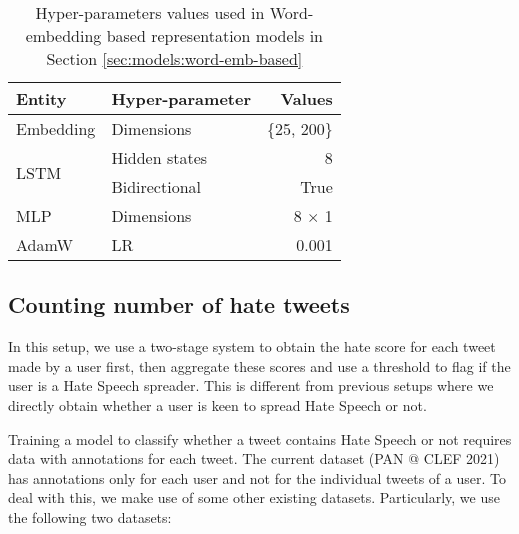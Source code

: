 

\begin{table}[htbp]
\centering
\begin{tabular}{llr}
\hline
\textbf{Entity} & \textbf{Hyper-parameter} & \textbf{Values} \\
\hline
Embedding & Dimensions & \{25, 200\} \\ \hline
\multirow{2}{*}{LSTM} & Hidden states & 8 \\
 & Bidirectional & True \\ \hline
MLP & Dimensions & 8 $\times$ 1 \\ \hline
AdamW & LR & 0.001 \\ \hline
\end{tabular}
\caption{Hyper-parameters values used in Word-embedding based representation models in Section \ref{sec:models:word-emb-based}}
\label{tab:models:hparams-word-emb-based}
\end{table}




\subsection{Counting number of hate tweets}
\label{sec:models:count-hate}

In this setup, we use a two-stage system to obtain the hate score for each tweet made by a user first, then aggregate these scores and use a threshold to flag if the user is a Hate Speech spreader. This is different from previous setups where we directly obtain whether a user is keen to spread Hate Speech or not. 

Training a model to classify whether a tweet contains Hate Speech or not requires data with annotations for each tweet. The current dataset (PAN @ CLEF 2021) has annotations only for each user and not for the individual tweets of a user. To deal with this, we make use of some other existing datasets. Particularly, we use the following two datasets:

